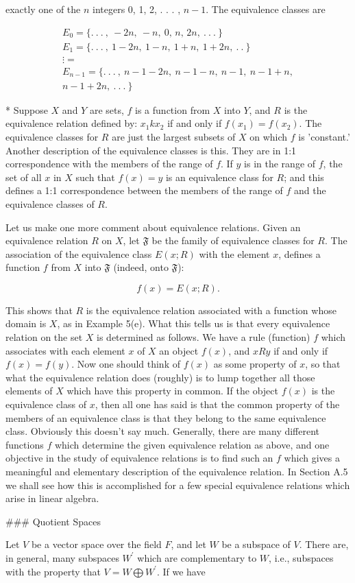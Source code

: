 exactly one of the \(n\) integers 0, 1, 2, . . . , \(n-1\). The equivalence classes are

\[\begin{array}{l}E_{0}=\{.\ .\ .\ ,\ -2n,\ -n,\ 0,\,n,\,2n,\ .\ .\ .\ \}\\ E_{1}=\{.\ .\ .\ ,\ 1-2n,\ 1-n,\ 1+n,\ 1+2n,\ .\ .\ \}\\ \vdots=\\ E_{n-1}=\{.\ .\ .\ ,\ n-1-2n,\ n-1-n,\ n-1,\ n-1+n,\\ n-1+2n,\ .\ .\ .\ \}\end{array}\]

* Suppose \(X\) and \(Y\) are sets, \(f\) is a function from \(X\) into \(Y\), and \(R\) is the equivalence relation defined by: \(x_{1}kx_{2}\) if and only if \(f(x_{1})=f(x_{2})\). The equivalence classes for \(R\) are just the largest subsets of \(X\) on which \(f\) is 'constant.' Another description of the equivalence classes is this. They are in 1:1 correspondence with the members of the range of \(f\). If \(y\) is in the range of \(f\), the set of all \(x\) in \(X\) such that \(f(x)=y\) is an equivalence class for \(R\); and this defines a 1:1 correspondence between the members of the range of \(f\) and the equivalence classes of \(R\).

Let us make one more comment about equivalence relations. Given an equivalence relation \(R\) on \(X\), let \(\mathfrak{F}\) be the family of equivalence classes for \(R\). The association of the equivalence class \(E(x;R)\) with the element \(x\), defines a function \(f\) from \(X\) into \(\mathfrak{F}\) (indeed, onto \(\mathfrak{F}\)):

\[f(x)=E(x;R).\]

This shows that \(R\) is the equivalence relation associated with a function whose domain is \(X\), as in Example 5(e). What this tells us is that every equivalence relation on the set \(X\) is determined as follows. We have a rule (function) \(f\) which associates with each element \(x\) of \(X\) an object \(f(x)\), and \(xRy\) if and only if \(f(x)=f(y)\). Now one should think of \(f(x)\) as some property of \(x\), so that what the equivalence relation does (roughly) is to lump together all those elements of \(X\) which have this property in common. If the object \(f(x)\) is the equivalence class of \(x\), then all one has said is that the common property of the members of an equivalence class is that they belong to the same equivalence class. Obviously this doesn't say much. Generally, there are many different functions \(f\) which determine the given equivalence relation as above, and one objective in the study of equivalence relations is to find such an \(f\) which gives a meaningful and elementary description of the equivalence relation. In Section A.5 we shall see how this is accomplished for a few special equivalence relations which arise in linear algebra.

### Quotient Spaces

Let \(V\) be a vector space over the field \(F\), and let \(W\) be a subspace of \(V\). There are, in general, many subspaces \(W^{\prime}\) which are complementary to \(W\), i.e., subspaces with the property that \(V=W\bigoplus W^{\prime}\). If we have 